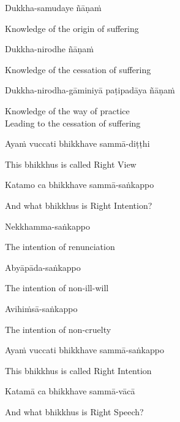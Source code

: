 Dukkha-samudaye ñāṇaṁ

\begin{english}
  Knowledge of the origin of suffering
\end{english}

Dukkha-nirodhe ñāṇaṁ

\begin{english}
  Knowledge of the cessation of suffering
\end{english}

Dukkha-nirodha-gāminiyā paṭipadāya ñāṇaṁ

\begin{english}
  Knowledge of the way of practice\\
  Leading to the cessation of suffering
\end{english}

Ayaṁ vuccati bhikkhave sammā-diṭṭhi

\begin{english}
  This bhikkhus is called Right View
\end{english}

Katamo ca bhikkhave sammā-saṅkappo

\begin{english}
  And what bhikkhus is Right Intention?
\end{english}

Nekkhamma-saṅkappo

\begin{english}
  The intention of renunciation
\end{english}

Abyāpāda-saṅkappo

\begin{english}
  The intention of non-ill-will
\end{english}

Avihiṁsā-saṅkappo

\begin{english}
  The intention of non-cruelty
\end{english}

Ayaṁ vuccati bhikkhave sammā-saṅkappo

\begin{english}
  This bhikkhus is called Right Intention
\end{english}

\ifbfiveversion\clearpage\fi

Katamā ca bhikkhave sammā-vācā

\begin{english}
  And what bhikkhus is Right Speech?
\end{english}

